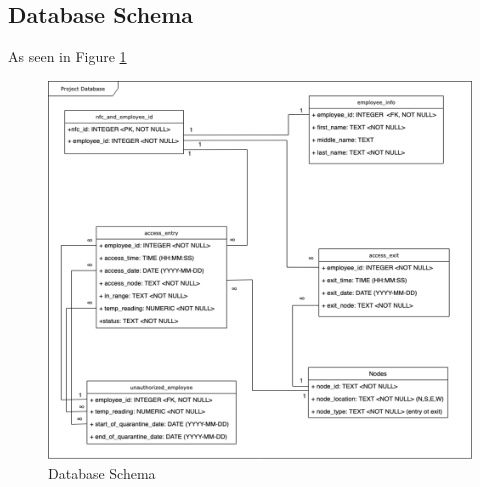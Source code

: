 \subsection{Database Schema}

As seen in Figure \ref{fig:db-schema}

\begin{figure}[!htb]
\centering
\includegraphics[width=\textwidth]{images/db-schema.png}
\caption{Database Schema}
\label{fig:db-schema}
\end{figure}

